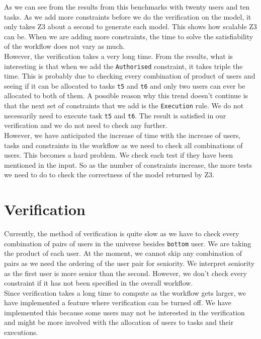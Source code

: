 \documentclass[a4paper]{report}
\begin{document}
As we can see from the results from this benchmarks with twenty users and ten tasks. As we add more constraints before we do the verification on the model, it only takes Z3 about a second to generate each model. This shows how scalable Z3 can be. When we are adding more constraints, the time to solve the satisfiability of the workflow does not vary as much. \\

However, the verification takes a very long time. From the results, what is interesting is that when we add the \texttt{Authorised} constraint, it takes triple the time. This is probably due to checking every combination of product of users and seeing if it can be allocated to tasks \texttt{t5} and \texttt{t6} and only two users can ever be allocated to both of them. A possible reason why this trend doesn't continue is that the next set of constraints that we add is the \texttt{Execution} rule. We do not necessarily need to execute task \texttt{t5} and \texttt{t6}. The result is satisfied in our verification and we do not need to check any further.\\

However, we have anticipated the increase of time with the increase of users, tasks and constraints in the workflow as we need to check all combinations of users. This becomes a hard problem. We check each test if they have been mentioned in the input. So as the number of constraints increase, the more tests we need to do to check the correctness of the model returned by Z3.

\section{Verification}
Currently, the method of verification is quite slow as we have to check every combination of pairs of users in the universe besides \texttt{bottom} user. We are taking the product of each user. At the moment, we cannot skip any combination of pairs as we need the ordering of the user pair for seniority. We interpret seniority as the first user is more senior than the second. However, we don't check every constraint if it has not been specified in the overall workflow.\\

Since verification takes a long time to compute as the workflow gets larger, we have implemented a feature where verification can be turned off. We have implemented this because some users may not be interested in the verification and might be more involved with the allocation of users to tasks and their executions. \\
\end{document}
